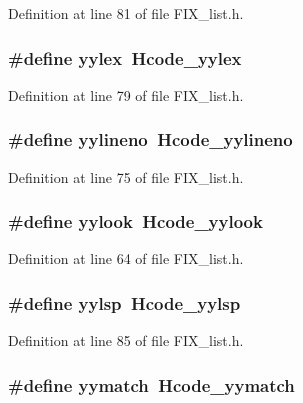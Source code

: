 Definition at line 81 of file FIX\_\-list.h.
\subsubsection{\setlength{\rightskip}{0pt plus 5cm}\#define yylex~Hcode\_\-yylex}\label{FIX__list_8h_5611300548b2030d86b6ab9168132b88}




Definition at line 79 of file FIX\_\-list.h.
\subsubsection{\setlength{\rightskip}{0pt plus 5cm}\#define \bf{yylineno}~Hcode\_\-yylineno}\label{FIX__list_8h_d71cf0fddcfe4f61de0929105b33226c}




Definition at line 75 of file FIX\_\-list.h.
\subsubsection{\setlength{\rightskip}{0pt plus 5cm}\#define yylook~Hcode\_\-yylook}\label{FIX__list_8h_83b49d0e75603403c74595b903c3d2ca}




Definition at line 64 of file FIX\_\-list.h.
\subsubsection{\setlength{\rightskip}{0pt plus 5cm}\#define \bf{yylsp}~Hcode\_\-yylsp}\label{FIX__list_8h_e32aca67dced6cb02908b4bc9042e8d3}




Definition at line 85 of file FIX\_\-list.h.
\subsubsection{\setlength{\rightskip}{0pt plus 5cm}\#define \bf{yymatch}~Hcode\_\-yymatch}\label{FIX__list_8h_5073c32108314a93d228bf482ce4ec87}




